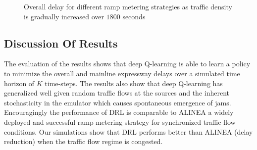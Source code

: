 \documentclass{sig-alternate-05-2015}
\begin{document}
\begin{figure}[!h]
	\centering
	\qquad
	\caption{Overall delay for different ramp metering strategies as traffic density is gradually increased over $1800$ seconds}
	\label{fig:density-delay}
\end{figure}

 

 \subsection{Discussion Of Results}
\label{subsec:results-discussion}


The evaluation of the results shows that deep Q-learning is able to learn a policy to minimize the overall and mainline expressway delays over a simulated time horizon of $K$ time-steps. The results also show that deep Q-learning has generalized well given random traffic flows at the sources and the inherent stochasticity in the emulator which causes spontaneous emergence of jams. Encouragingly the performance of DRL is comparable to ALINEA a widely deployed and successful ramp metering strategy for synchronized traffic flow conditions. Our simulations show that DRL performs better than ALINEA (delay reduction) when the traffic flow regime is congested.   
\end{document}
